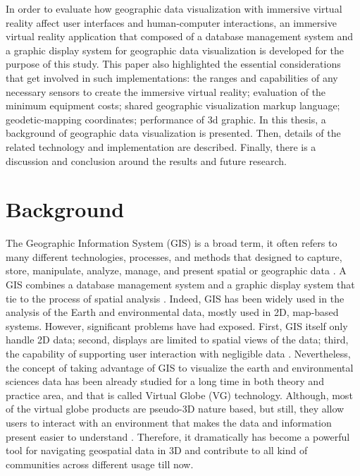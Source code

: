 In order to evaluate how geographic data visualization with immersive virtual reality affect user interfaces and human-computer interactions, an immersive virtual reality application that composed of a database management system and a graphic display system for geographic data visualization is developed for the purpose of this study. This paper also highlighted the essential considerations that get involved in such implementations: the ranges and capabilities of any necessary sensors to create the immersive virtual reality; evaluation of the minimum equipment costs; shared geographic visualization markup language; geodetic-mapping coordinates; performance of 3d graphic. In this thesis, a background of geographic data visualization is presented. Then, details of the related technology and implementation are described. Finally, there is a discussion and conclusion around the results and future research.

\section{Background}
\label{section:background}

The Geographic Information System (GIS) is a broad term, it often refers to many different technologies, processes, and methods that designed to capture, store, manipulate, analyze, manage, and present spatial or geographic data \cite{wiki.gis.2016}. A GIS combines a database management system and a graphic display system that tie to the process of spatial analysis \cite{rhyne.virtual.1997}. Indeed, GIS has been widely used in the analysis of the Earth and environmental data, mostly used in 2D, map-based systems. However, significant problems have had exposed. First, GIS itself only handle 2D data; second, displays are limited to spatial views of the data; third, the capability of supporting user interaction with negligible data \cite{rhyne.visualization-gis.1994}. Nevertheless, the concept of taking advantage of GIS to visualize the earth and environmental sciences data has been already studied for a long time in both theory and practice area, and that is called Virtual Globe (VG) technology. Although, most of the virtual globe products are pseudo-3D nature based, but still, they allow users to interact with an environment that makes the data and information present easier to understand \cite{tuttle.virtual-globes.2008}. Therefore, it dramatically has become a powerful tool for navigating geospatial data in 3D and contribute to all kind of communities across different usage till now. 


